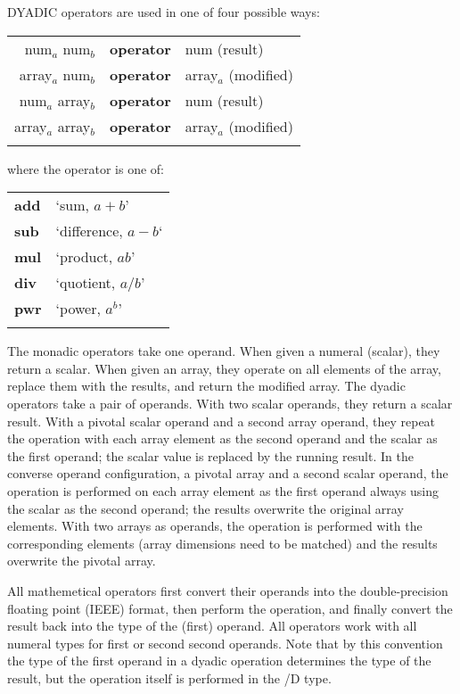 \noindent DYADIC operators are used in one of four possible ways:
\nopagebreak \\

\begin{tabular}{>{\sffamily}r>{\sffamily\bfseries}l>{\sffamily}l}
num$_a$ num$_b$ & operator & num (result)\\
array$_a$ num$_b$ & operator & array$_a$ (modified)\\
num$_a$ array$_b$ & operator & num (result)\\
array$_a$ array$_b$ & operator & array$_a$ (modified)\\\\
\end{tabular}

\noindent where the operator is one of:\\
\nopagebreak

\begin{tabular}{>{\sffamily\bfseries}l>{\normalfont}l}
add  & `sum, $a+b$'\\
sub  & `difference, $a-b$`\\
mul  & `product, $ab$'\\
div  & `quotient, $a/b$'\\
pwr  & `power, $a^b$'\\\\
\end{tabular}

The monadic operators take one operand. When given a numeral (scalar), they return a scalar. When given an array, they operate on all elements of the array, replace them with the results, and return the modified array. The dyadic operators take a pair of operands. With two scalar operands, they return a scalar result. With a pivotal scalar operand and a second array operand, they repeat the operation with each array element as the second operand and the scalar as the first operand; the scalar value is replaced by the running  result. In the converse operand configuration, a pivotal array and a second scalar operand, the operation is performed on each array element as the first operand always using the scalar as the second operand; the results overwrite the original array elements. With two arrays as operands, the operation is performed with the corresponding elements (array dimensions need to be matched) and the results overwrite the pivotal array.

All mathemetical operators first convert their operands into the double-precision floating point (IEEE) format, then perform the operation, and finally convert the result back into the type of the (first) operand. All operators work with all numeral types for first or second second operands. Note that by this convention the type of the first operand in a dyadic operation determines the type of the result, but the operation itself is performed in the /D type.

